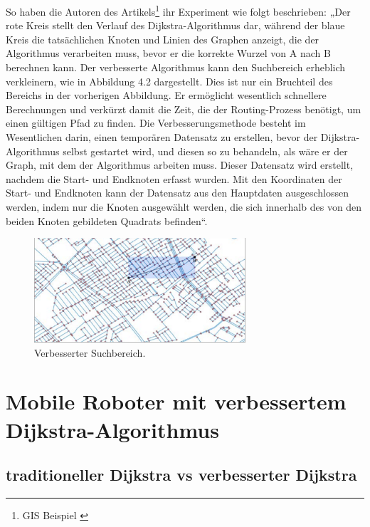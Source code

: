 So haben die Autoren des Artikels\footnote{GIS Beispiel \cite{HamidAli2020}}  ihr Experiment wie folgt beschrieben:
\newline
\newline
 „Der rote Kreis stellt den Verlauf des Dijkstra-Algorithmus dar, während der blaue Kreis die tatsächlichen Knoten und Linien des Graphen anzeigt, die der Algorithmus verarbeiten muss, bevor er die korrekte Wurzel von A nach B berechnen kann. Der verbesserte Algorithmus kann den Suchbereich erheblich verkleinern, wie in Abbildung 4.2 dargestellt. Dies ist nur ein Bruchteil des Bereichs in der vorherigen Abbildung. Er ermöglicht wesentlich schnellere Berechnungen und verkürzt damit die Zeit, die der Routing-Prozess benötigt, um einen gültigen Pfad zu finden. Die Verbesserungsmethode besteht im Wesentlichen darin, einen temporären Datensatz zu erstellen, bevor der Dijkstra-Algorithmus selbst gestartet wird, und diesen so zu behandeln, als wäre er der Graph, mit dem der Algorithmus arbeiten muss. Dieser Datensatz wird erstellt, nachdem die Start- und Endknoten erfasst wurden. Mit den Koordinaten der Start- und Endknoten kann der Datensatz aus den Hauptdaten ausgeschlossen werden, indem nur die Knoten ausgewählt werden, die sich innerhalb des von den beiden Knoten gebildeten Quadrats befinden“.

\begin{figure}[H]
	\centering
	\includegraphics[width=0.7\textwidth]{images/GIS_blue.PNG}
	\caption{\label{fig:GIS_red}Verbesserter Suchbereich\cite{HamidAli2020}.}
\end{figure}

\section{Mobile Roboter mit verbessertem Dijkstra-Algorithmus}
\label{Mobile Roboter mit verbessertem Dijkstra-Algorithmus}
\subsection{traditioneller Dijkstra vs verbesserter Dijkstra }

